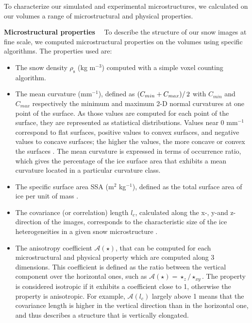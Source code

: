 \documentclass[draft,ms]{agujournal2019}
\begin{document}
To characterize our simulated and experimental microstructures, we calculated on our volumes a range of microstructural and physical properties.

\noindent \textbf{Microstructural properties}$\quad$ To describe the structure of our snow images at fine scale, we computed microstructural properties on the volumes using specific algorithms. The properties used are:
\begin{itemize}
    \item The snow density $\rho_{\mathrm{s}}$ (kg m$^{-3}$) computed with a simple voxel counting algorithm.
    
    \item The mean curvature (mm$^{-1}$), defined as $\left(C_{min} + C_{max})\right/2$ with $C_{min}$ and $C_{max}$ respectively the minimum and maximum 2-D normal curvatures at one point of the surface. As those values are computed for each point of the surface, they are represented as statistical distributions. Values near 0 mm$^{-1}$ correspond to flat surfaces, positive values to convex surfaces, and negative values to concave surfaces; the higher the values, the more concave or convex the surfaces \cite{ogawa2006representation}. The mean curvature is expressed in terms of occurrence ratio, which gives the percentage of the ice surface area that exhibits a mean curvature located in a particular curvature class.
    
    \item The specific surface area SSA (m$^2$ kg$^{-1}$), defined as the total surface area of ice per unit of mass \cite{dumont2021experimental, flin2011computations}.
    
    \item  The covariance (or correlation) length $l_{c}$, calculated along the x-, y-and z- direction of the images, corresponds to the characteristic size of the ice heterogeneities in a given snow microstructure \cite{lowe2013general}. 
    
    \item The anisotropy coefficient
    $\mathcal{A}(\star)$, that can be computed for each microstructural and physical property which are computed along 3 dimensions. This coefficient is defined as the ratio between the vertical component over the horizontal ones, such as $\mathcal{A}(\star)=\star_{z} / \star_{x y}$. The property is considered isotropic if it exhibits a coefficient close to 1, otherwise the property is anisotropic. For example, $\mathcal{A}(l_c)$ largely above 1 means that the covariance length is higher in the vertical direction than in the horizontal one, and thus describes a structure that is vertically elongated.
\end{itemize}
\end{document}
